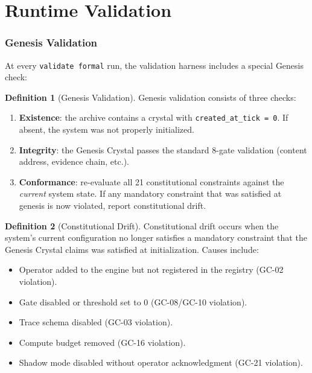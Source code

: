 \documentclass[11pt,a4paper,twoside]{article}
\theoremstyle{definition}
\newtheorem{definition}{Definition}[section]
\theoremstyle{plain}
\theoremstyle{remark}
\begin{document}
\part{Runtime Validation}\label{part:validation}

\section{Genesis Validation}\label{sec:genesisval}

At every \texttt{validate formal} run, the validation harness includes
a special Genesis check:

\begin{definition}[Genesis Validation]\label{def:genesisval}
Genesis validation consists of three checks:
\begin{enumerate}[nosep,label=(GV\arabic*)]
  \item \textbf{Existence}: the archive contains a crystal with
        \texttt{created\_at\_tick = 0}. If absent, the system was
        not properly initialized.
  \item \textbf{Integrity}: the Genesis Crystal passes the standard
        8-gate validation (content address, evidence chain, etc.).
  \item \textbf{Conformance}: re-evaluate all 21 constitutional
        constraints against the \emph{current} system state. If any
        mandatory constraint that was satisfied at genesis is now
        violated, report constitutional drift.
\end{enumerate}
\end{definition}

\begin{definition}[Constitutional Drift]\label{def:drift}
Constitutional drift occurs when the system's current configuration
no longer satisfies a mandatory constraint that the Genesis Crystal
claims was satisfied at initialization. Causes include:
\begin{itemize}[nosep]
  \item Operator added to the engine but not registered in the
        registry (GC-02 violation).
  \item Gate disabled or threshold set to 0 (GC-08/GC-10 violation).
  \item Trace schema disabled (GC-03 violation).
  \item Compute budget removed (GC-16 violation).
  \item Shadow mode disabled without operator acknowledgment
        (GC-21 violation).
\end{itemize}
\end{definition}
\end{document}
